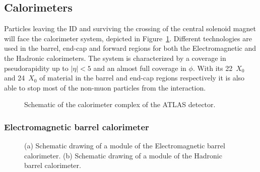 \subsection{Calorimeters}\label{sec:calo}

Particles leaving the ID and surviving the crossing of the central solenoid magnet
will face the calorimeter system, depicted in Figure~\ref{fig:calorimeters}.
Different technologies are used in the barrel, end-cap and forward regions for both the
Electromagnetic and the Hadronic calorimeters. The system is characterized by a coverage
in pseudorapidity up to $|\eta|<5$ and an almost full coverage in $\phi$. With its 
22~$X_0$ and 24~$X_0$ of material in the barrel and end-cap regions respectively 
it is also able to stop most of the non-muon particles from the interaction.

\begin{figure}[tb]\begin{center}
	\caption{Schematic of the calorimeter complex of the ATLAS detector.\label{fig:calorimeters}}
\end{center}\end{figure}


\subsubsection{Electromagnetic barrel calorimeter}\label{sec:emcalbarrel}


\begin{figure}[tb]\begin{center}
	\caption{(a) Schematic drawing of a module of the Electromagnetic barrel calorimeter. 
        (b) Schematic drawing of a module of the Hadronic barrel calorimeter.}
\end{center}\end{figure}

